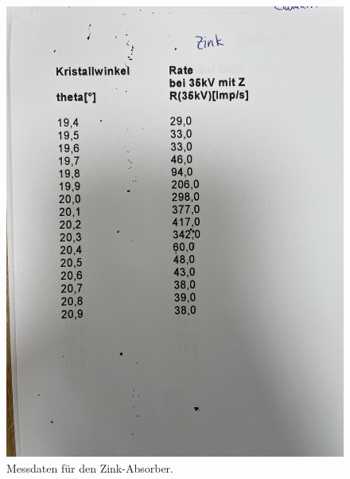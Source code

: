   \begin{figure}[H]
    \centering
    \includegraphics[width=\textwidth, angle=270, origin=c]{"content/Bilder/Zink.jpg"}
    \caption{Messdaten für den Zink-Absorber.}
    \label{fig:Messungen_4}
  \end{figure}
